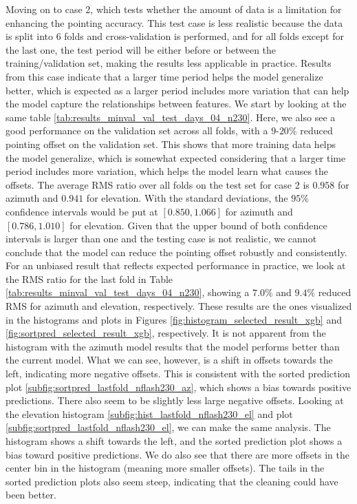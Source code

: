 Moving on to case 2, which tests whether the amount of data is a limitation for enhancing the pointing accuracy.
This test case is less realistic because the data is split into $6$ folds and cross-validation is performed,
and for all folds except for the last one, the test period will be either before or between the training/validation set, making the results less applicable in practice.
Results from this case indicate that a larger time period helps the model generalize better, which is expected as a larger period includes more variation that can help the model capture the relationships between features.
We start by looking at the same table \ref{tab:results_minval_val_test_days_04_n230}.
Here, we also see a good performance on the validation set across all folds, with a $9$-$20\%$ reduced pointing offset on the validation set.
This shows that more training data helps the model generalize, which is somewhat expected considering that a larger time period includes more variation,
which helps the model learn what causes the offsets.
The average RMS ratio over all folds on the test set for case 2 is $0.958$ for azimuth and $0.941$ for elevation.
With the standard deviations, the $95\%$ confidence intervals would be put at $[0.850, 1.066]$ for azimuth and $[0.786, 1.010]$ for elevation.
Given that the upper bound of both confidence intervals is larger than one and the testing case is not realistic, we cannot conclude that the model can reduce the pointing offset robustly and consistently.
For an unbiased result that reflects expected performance in practice, we look at the RMS ratio for the last fold in Table \ref{tab:results_minval_val_test_days_04_n230},
showing a $7.0\%$ and $9.4\%$ reduced RMS for azimuth and elevation, respectively.
These results are the ones visualized in the histograms and plots in Figures \ref{fig:histogram_selected_result_xgb} and \ref{fig:sortpred_selected_result_xgb}, respectively.
It is not apparent from the histogram with the azimuth model results that the model performs better than the current model.
What we can see, however, is a shift in offsets towards the left, indicating more negative offsets.
This is consistent with the sorted prediction plot \ref{subfig:sortpred_lastfold_nflash230_az}, which shows a bias towards positive predictions.
There also seem to be slightly less large negative offsets.
Looking at the elevation histogram \ref{subfig:hist_lastfold_nflash230_el} and plot \ref{subfig:sortpred_lastfold_nflash230_el}, we can make the same analysis.
The histogram shows a shift towards the left, and the sorted prediction plot shows a bias toward positive predictions.
We do also see that there are more offsets in the center bin in the histogram (meaning more smaller offsets).
The tails in the sorted prediction plots also seem steep, indicating that the cleaning could have been better.\\


